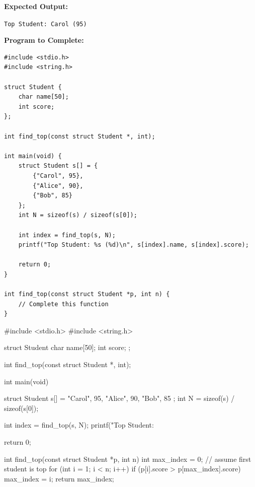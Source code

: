 \documentclass[12pt, a4paper, answers, addpoints]{exam}
\begin{document}
\begin{questions}
{\textbf{Expected Output:}

\texttt{Top Student: Carol (95)}


\textbf{Program to Complete:}

\begin{lstlisting}[basicstyle=\small\ttfamily]
#include <stdio.h>
#include <string.h>

struct Student {
    char name[50];
    int score;
};

int find_top(const struct Student *, int);

int main(void) {
    struct Student s[] = {
        {"Carol", 95},
        {"Alice", 90},
        {"Bob", 85}
    };
    int N = sizeof(s) / sizeof(s[0]);

    int index = find_top(s, N);
    printf("Top Student: %s (%d)\n", s[index].name, s[index].score);

    return 0;
}

int find_top(const struct Student *p, int n) {
    // Complete this function
}
\end{lstlisting}

}


\begin{CcodeSol}

#include <stdio.h>
#include <string.h>

struct Student {
    char name[50];
    int score;
};

int find_top(const struct Student *, int);

int main(void) {
    struct Student s[] = {
        {"Carol", 95},
        {"Alice", 90},
        {"Bob", 85}
    };
    int N = sizeof(s) / sizeof(s[0]);

    int index = find_top(s, N);
    printf("Top Student: %

    return 0;
}
int find_top(const struct Student *p, int n) {
    int max_index = 0;              // assume first student is top
    for (int i = 1; i < n; i++) {
        if (p[i].score > p[max_index].score) {
            max_index = i;
        }
    }
    return max_index;
}

\end{CcodeSol}


\end{questions}

\vfill
\noindent{}
\end{document}
